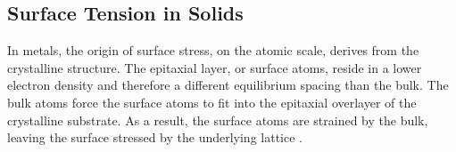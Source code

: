 %

\subsection{Surface Tension in Solids}
In metals, the origin of surface stress, on the atomic scale, derives from the crystalline structure. The epitaxial layer, or surface atoms, reside in a lower electron density and therefore a different equilibrium spacing than the bulk. The bulk atoms force the surface atoms to fit into the epitaxial overlayer of the crystalline substrate. As a result, the surface atoms are strained by the bulk, leaving the surface stressed by the underlying lattice \cite{cammarata1994surface}. 

